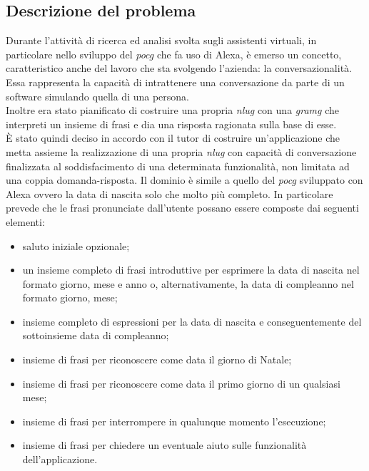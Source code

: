 	\subsection{Descrizione del problema}
	Durante l'attività di ricerca ed analisi svolta sugli assistenti virtuali, in particolare nello sviluppo del \emph{\gls{pocg}} che fa uso di Alexa, è emerso un concetto, caratteristico anche del lavoro che sta svolgendo l'azienda: la conversazionalità. Essa rappresenta la capacità di intrattenere una conversazione da parte di un software simulando quella di una persona. \\
	Inoltre era stato pianificato di costruire una propria \emph{\gls{nlug}} con una \emph{\gls{gramg}} che interpreti un insieme di frasi e dia una risposta ragionata sulla base di esse. \\
	È stato quindi deciso in accordo con il tutor di costruire un'applicazione che metta assieme la realizzazione di una propria \emph{\gls{nlug}} con capacità di conversazione finalizzata al soddisfacimento di una determinata funzionalità, non limitata ad una coppia domanda-risposta. Il dominio è simile a quello del \emph{\gls{pocg}} sviluppato con Alexa ovvero la data di nascita solo che molto più completo. In particolare prevede che le frasi pronunciate dall'utente possano essere composte dai seguenti elementi:
	\begin{itemize}
		\item saluto iniziale opzionale;
		\item un insieme completo di frasi introduttive per esprimere la data di nascita nel formato giorno, mese e anno o, alternativamente, la data di compleanno nel formato giorno, mese;
		\item insieme completo di espressioni per la data di nascita e conseguentemente del sottoinsieme data di compleanno;
		\item insieme di frasi per riconoscere come data il giorno di Natale;
		\item insieme di frasi per riconoscere come data il primo giorno di un qualsiasi mese;
		\item insieme di frasi per interrompere in qualunque momento l'esecuzione;
		\item insieme di frasi per chiedere un eventuale aiuto sulle funzionalità dell'applicazione.
	\end{itemize}
